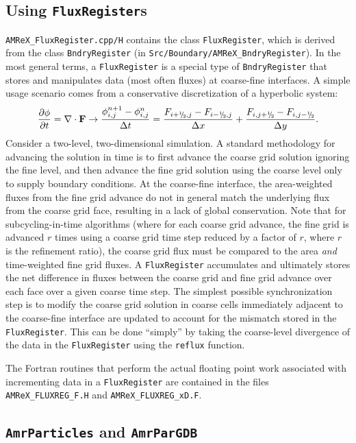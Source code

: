 \subsection{Using {\tt FluxRegister}s}
\label{sec:amrcore:fluxreg}
{\tt AMReX\_FluxRegister.cpp/H} contains the class {\tt FluxRegister}, which is derived from
the class {\tt BndryRegister} (in {\tt Src/Boundary/AMReX\_BndryRegister}).
In the most general terms, a {\tt FluxRegister} is a special type of {\tt BndryRegister} that
stores and manipulates data (most often fluxes) at coarse-fine interfaces.
A simple usage scenario comes from a conservative discretization of a hyperbolic system:
\begin{equation}
\frac{\partial\phi}{\partial t} = \nabla\cdot{\bf F}
\rightarrow
\frac{\phi_{i,j}^{n+1}-\phi_{i,j}^n}{\Delta t} = \frac{F_{i+\myhalf,j}-F_{i-\myhalf,j}}{\Delta x} + \frac{F_{i,j+\myhalf} - F_{i,j-\myhalf}}{\Delta y}.
\end{equation}
Consider a two-level, two-dimensional simulation.  A standard methodology for advancing the solution in 
time is to first advance the coarse grid solution ignoring the fine level, and then advance the fine 
grid solution using the coarse level only to supply boundary conditions.  At the coarse-fine interface, 
the area-weighted fluxes from the fine grid advance do not in general match the underlying flux from 
the coarse grid face, resulting in a lack of global conservation.  Note that for subcycling-in-time algorithms
(where for each coarse grid advance, the fine grid is advanced $r$ times using a coarse grid time step 
reduced by a factor of $r$, where $r$ is the refinement ratio), the coarse grid flux must 
be compared to the area {\it and} time-weighted fine grid fluxes.  A {\tt FluxRegister} accumulates 
and ultimately stores the net difference in fluxes between the coarse grid and fine grid advance over 
each face over a given coarse time step.  The simplest possible synchronization step is to modify
the coarse grid solution in coarse cells immediately adjacent to the coarse-fine interface are updated
to account for the mismatch stored in the {\tt FluxRegister}.  This can be done ``simply'' by taking
the coarse-level divergence of the data in the {\tt FluxRegister} using the {\tt reflux} function.

The Fortran routines that perform the actual floating point work associated with 
incrementing data in a {\tt FluxRegister} are
contained in the files {\tt AMReX\_FLUXREG\_F.H} and {\tt AMReX\_FLUXREG\_xD.F}.

\subsection{{\tt AmrParticles} and {\tt AmrParGDB}}


